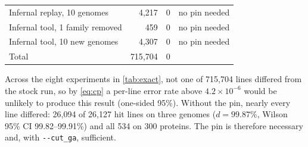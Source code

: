 \documentclass[letterpaper,twocolumn,10pt]{article}
\theoremstyle{definition}
\newcommand{\cutga}{\texttt{-{}-cut\_ga}\xspace}
\begin{document}
\begin{table}[t]
\begin{tabular}{@{}lrcr@{}}
Infernal replay, 10 genomes & 4{,}217 & 0 & no pin needed \\
Infernal tool, 1 family removed & 459 & 0 & no pin needed \\
Infernal tool, 10 new genomes & 4{,}307 & 0 & no pin needed \\
\midrule
Total & 715{,}704 & 0 & \\
\bottomrule
\end{tabular}
\end{table}

Across the eight experiments in \cref{tab:exact}, not one of 715{,}704 lines differed from the stock run, so by
\cref{eq:cp} a per\nobreakdash-line error rate above $4.2\times10^{-6}$ would be unlikely to produce this result (one\nobreakdash-sided 95\%).
Without the pin, nearly every line differed: 26{,}094 of 26{,}127 hit lines on three genomes ($d = 99.87\%$, Wilson 95\%
CI 99.82--99.91\%) and all 534 on 300 proteins. The pin is therefore necessary and, with \cutga, sufficient.
\end{document}
